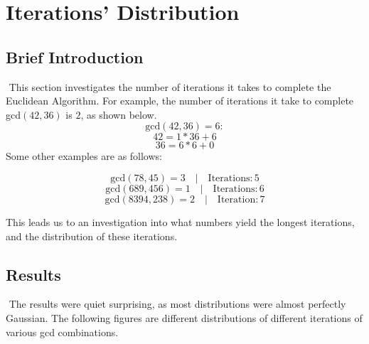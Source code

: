 \documentclass[11pt]{article}
\begin{document}
\tableofcontents
\newpage
\newpage

\section{Iterations' Distribution}
	\subsection{Brief Introduction} $ $ \indent This section investigates the number of iterations it takes to complete the Euclidean Algorithm. For example, the number of iterations it take to complete gcd$(42,36)$ is $2$, as shown below.
		$$\mathrm{gcd}(42,36) = 6:$$
	\begin{equation}
		42 = 1 * 36 + 6
	\end{equation}
	\begin{equation}
		36 = 6 * 6 + 0
	\end{equation}
Some other examples are as follows:

$$\mathrm{gcd}(78,45) = 3 \quad| \quad\mathrm{Iterations}: 5$$
$$\mathrm{gcd}(689,456) = 1 \quad|\quad \mathrm{Iterations}: 6$$
$$\mathrm{gcd}(8394,238) = 2 \quad|\quad \mathrm{Iteration}: 7$$
		
This leads us to an investigation into what numbers yield the longest iterations, and the distribution of these iterations.

	\subsection{Results} $ $
	\indent The results were quiet surprising, as most distributions were almost perfectly Gaussian. The following figures are different distributions of different iterations of various gcd combinations.\\
	
\end{document}
